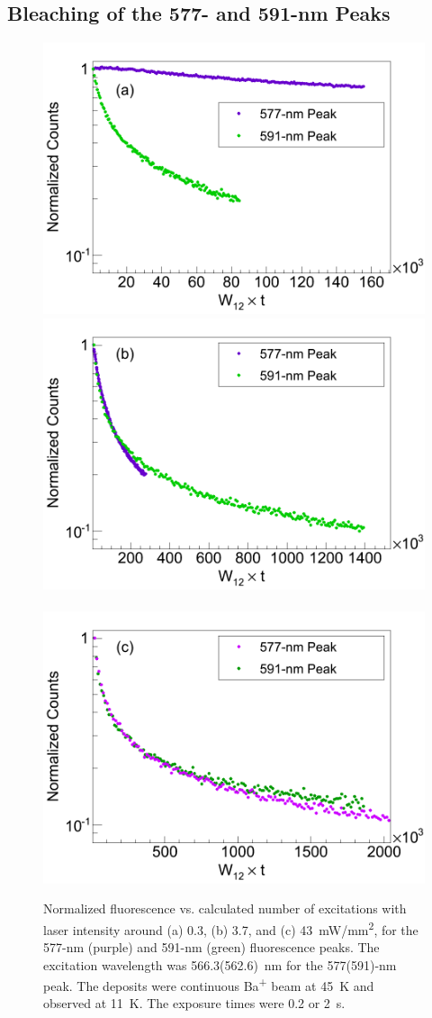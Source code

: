 \subsection{Bleaching of the 577- and 591-nm Peaks}
\label{sec:bleach577and591}

\begin{figure} %
        \centering
                \includegraphics[width=.5\textwidth]{figures/bleach_compareEmission577vs591_specificSigmas_a.png}
                \includegraphics[width=.5\textwidth]{figures/bleach_compareEmission577vs591_specificSigmas_b.png}
                ~
                \includegraphics[width=.5\textwidth]{figures/bleach_compareEmission577vs591_specificSigmas_c.png}
                \caption{Normalized fluorescence vs. calculated number of excitations with laser intensity around (a) 0.3, (b) 3.7, and (c) 43~mW/mm\textsuperscript{2}, for the 577-nm (purple) and 591-nm (green) fluorescence peaks.  The excitation wavelength was 566.3(562.6)~nm for the 577(591)-nm peak.  The deposits were continuous Ba\textsuperscript{+} beam at 45~K and observed at 11~K.  The exposure times were 0.2 or 2~s.}
\label{fig:bleach_577vs591}
\end{figure}

